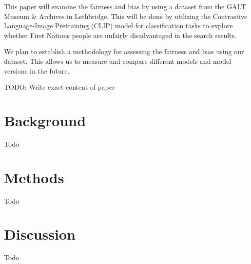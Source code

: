 \documentclass[12pt,a4paper,titlepage,oneside,english]{article}
\begin{document}
This paper will examine the fairness and bias by using a dataset from the GALT Museum \& Archives in Lethbridge. This will be done by utilizing the Contrastive Language-Image Pretraining (CLIP) model for classification tasks to explore whether First Nations people are unfairly disadvantaged in the search results.

We plan to establish a methodology for assessing the fairness and bias using our dataset. This allows us to measure and compare different models and model versions in the future. 

TODO: Write exact content of paper


\section{Background}

Todo

\section{Methods}

Todo

\section{Discussion}

Todo

\newpage
\setcounter{page}{1}
\onehalfspacing
{}


\end{document}
